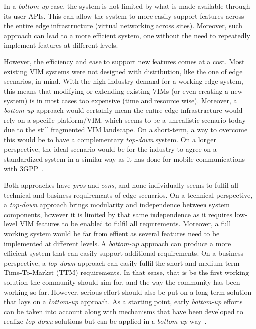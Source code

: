 In a \emph{bottom-up} case, the system is not limited by what is made available through its user APIs. This can allow the system to more easily support features across the entire edge infrastructure (\eg virtual networking across sites). Moreover, such approach can lead to a more efficient system, one without the need to repeatedly implement features at different levels. %

However, the efficiency and ease to support new features comes at a cost. Most existing VIM systems were not designed with distribution, like the one of edge scenarios, in mind. With the high industry demand for a working edge system, this means that modifying or extending existing VIMs (or even creating a new system) is in most cases too expensive (time and resource wise).
Moreover, a \emph{bottom-up} approach would certainly mean the entire edge infrastructure would rely on a specific platform/VIM, which seems to be a unrealistic scenario today due to the still fragmented VIM landscape. On a short-term, a way to overcome this would be to have a complementary \emph{top-down} system. On a longer perspective, the ideal scenario would be for the industry to agree on a standardized system in a similar way as it has done for mobile communications with 3GPP~\cite{3gpp}.


Both approaches have \emph{pros} and \emph{cons}, and none individually seems to fulfil all technical and business requirements of edge scenarios. 
On a technical perspective, a \emph{top-down} approach brings modularity and independence between system components, however it is limited by that same independence as it requires low-level VIM features to be enabled to fulfil all requirements. Moreover, a full working system would be far from effient as several features need to be implemented at different levels.
A \emph{bottom-up} approach can produce a more efficient system that can easily support additional requirements.
On a business perspective, a \emph{top-down} approach can easily fulfil the short and medium-term Time-To-Market (TTM) requirements. In that sense, that is be the first working solution the community should aim for, and the way the community has been working so far. However, serious effort should also be put on a long-term solution that lays on a \emph{bottom-up} approach. As a starting point, early \emph{bottom-up} efforts
 can be taken into account along with mechanisms that have been developed to realize \emph{top-down} solutions but can be applied in a \emph{bottom-up} way~\cite{ericsson-p2p}.


